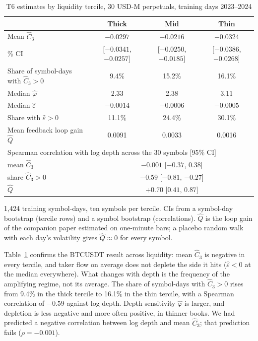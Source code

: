 \begin{table}[t]\centering
\begin{threeparttable}
\caption{T6 estimates by liquidity tercile, 30 USD-M perpetuals, training days 2023--2024}\label{tab:x3}
\small\setlength{\tabcolsep}{5pt}
\begin{tabular}{lccc}
\toprule
 & Thick & Mid & Thin\\
\midrule
Mean $\hat C_3$ & $-0.0297$ & $-0.0216$ & $-0.0324$\\
\quad 95\% CI & [$-0.0341$, $-0.0257$] & [$-0.0250$, $-0.0185$] & [$-0.0386$, $-0.0268$]\\
Share of symbol-days with $\hat C_3>0$ & 9.4\% & 15.2\% & 16.1\%\\
Median $\hat\varphi$ & 2.33 & 2.38 & 3.11\\
Median $\hat\varepsilon$ & $-0.0014$ & $-0.0006$ & $-0.0005$\\
Share with $\hat\varepsilon>0$ & 11.1\% & 24.4\% & 30.1\%\\
Mean feedback loop gain $\hat Q$ & 0.0091 & 0.0033 & 0.0016\\
\midrule
\multicolumn{4}{l}{Spearman correlation with log depth across the 30 symbols [95\% CI]}\\
\quad mean $\hat C_3$ & \multicolumn{3}{c}{$-0.001$ [$-0.37$, $0.38$]}\\
\quad share $\hat C_3>0$ & \multicolumn{3}{c}{$-0.59$ [$-0.81$, $-0.27$]}\\
\quad $\hat Q$ & \multicolumn{3}{c}{$+0.70$ [$0.41$, $0.87$]}\\
\bottomrule
\end{tabular}
\begin{tablenotes}\footnotesize\item 1{,}424 training symbol-days, ten symbols per tercile. CIs from a symbol-day bootstrap (tercile rows) and a symbol bootstrap (correlations). $\hat Q$ is the loop gain of the companion paper estimated on one-minute bars; a placebo random walk with each day's volatility gives $\hat Q\approx0$ for every symbol. \end{tablenotes}
\end{threeparttable}
\end{table}

Table~\ref{tab:x3} confirms the BTCUSDT result across liquidity: mean $\hat C_3$ is negative in every tercile, and taker flow on average does not deplete the side it hits ($\hat\varepsilon<0$ at the median everywhere). What changes with depth is the frequency of the amplifying regime, not its average. The share of symbol-days with $\hat C_3>0$ rises from 9.4\% in the thick tercile to 16.1\% in the thin tercile, with a Spearman correlation of $-0.59$ against log depth. Depth sensitivity $\hat\varphi$ is larger, and depletion is less negative and more often positive, in thinner books. We had predicted a negative correlation between log depth and mean $\hat C_3$; that prediction fails ($\rho=-0.001$).

